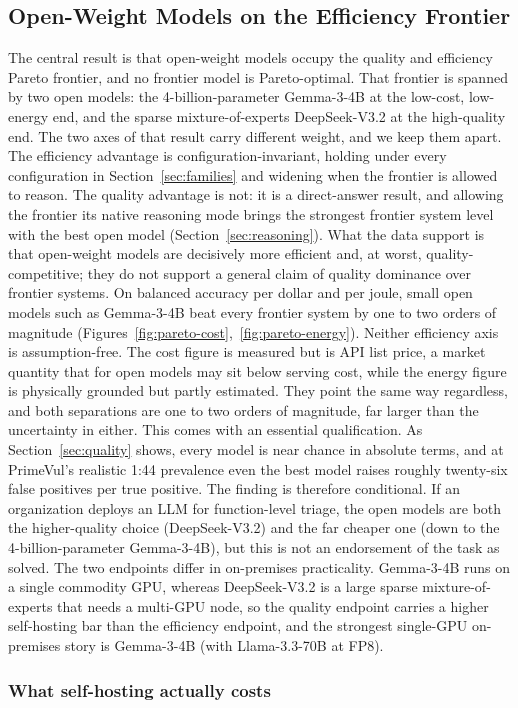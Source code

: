 \documentclass[computers,article,submit,moreauthors]{Definitions/mdpi}
\begin{document}
\subsection{Open-Weight Models on the Efficiency Frontier}
The central result is that open-weight models occupy the quality and efficiency Pareto frontier, and no frontier model is Pareto-optimal. That frontier is spanned by two open models: the 4-billion-parameter Gemma-3-4B at the low-cost, low-energy end, and the sparse mixture-of-experts DeepSeek-V3.2 at the high-quality end. The two axes of that result carry different weight, and we keep them apart. The efficiency advantage is configuration-invariant, holding under every configuration in Section~\ref{sec:families} and widening when the frontier is allowed to reason. The quality advantage is not: it is a direct-answer result, and allowing the frontier its native reasoning mode brings the strongest frontier system level with the best open model (Section~\ref{sec:reasoning}). What the data support is that open-weight models are decisively more efficient and, at worst, quality-competitive; they do not support a general claim of quality dominance over frontier systems. On balanced accuracy per dollar and per joule, small open models such as Gemma-3-4B beat every frontier system by one to two orders of magnitude (Figures~\ref{fig:pareto-cost},~\ref{fig:pareto-energy}). Neither efficiency axis is assumption-free. The cost figure is measured but is API list price, a market quantity that for open models may sit below serving cost, while the energy figure is physically grounded but partly estimated. They point the same way regardless, and both separations are one to two orders of magnitude, far larger than the uncertainty in either. This comes with an essential qualification. As Section~\ref{sec:quality} shows, every model is near chance in absolute terms, and at PrimeVul's realistic 1:44 prevalence even the best model raises roughly twenty-six false positives per true positive. The finding is therefore conditional. If an organization deploys an LLM for function-level triage, the open models are both the higher-quality choice (DeepSeek-V3.2) and the far cheaper one (down to the 4-billion-parameter Gemma-3-4B), but this is not an endorsement of the task as solved. The two endpoints differ in on-premises practicality. Gemma-3-4B runs on a single commodity GPU, whereas DeepSeek-V3.2 is a large sparse mixture-of-experts that needs a multi-GPU node, so the quality endpoint carries a higher self-hosting bar than the efficiency endpoint, and the strongest single-GPU on-premises story is Gemma-3-4B (with Llama-3.3-70B at FP8). \subsubsection*{What self-hosting actually costs}
\end{document}
